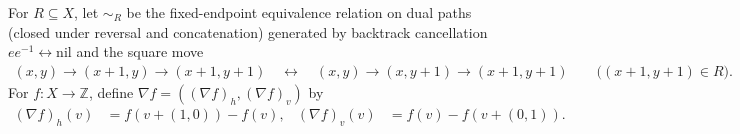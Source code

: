 \begin{definition}%
    \label{def:peps_dual_flux_homotopy}
    \leanok
    For $R\subseteq X$, let $\sim_R$ be the fixed-endpoint equivalence relation
    on dual paths (closed under reversal and concatenation) generated by
    backtrack cancellation $ee^{-1}\leftrightarrow\mathrm{nil}$ and the square
    move \cite[proof of Lemma~6.14]{Schuch2010PEPS}
    \begin{align}
        (x,y)\to(x+1,y)\to(x+1,y+1)
        \quad\longleftrightarrow\quad
        (x,y)\to(x,y+1)\to(x+1,y+1)
        \qquad\bigl((x+1,y+1)\in R\bigr).
        \label{eq:peps_dual_square_move}
    \end{align}
    For $f:X\to\mathbb Z$, define $\nabla f=((\nabla f)_h,(\nabla f)_v)$ by
    \begin{align}
        (\nabla f)_h(v) & =f(v+(1,0))-f(v), &
        (\nabla f)_v(v) & =f(v)-f(v+(0,1)).
        \label{eq:peps_dual_gradient}
    \end{align}
\end{definition}

